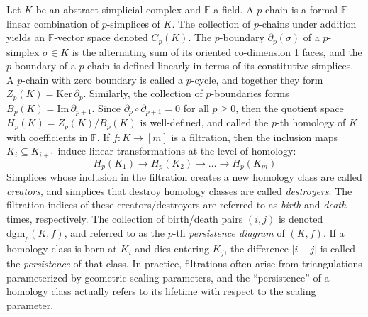 \documentclass[sn-mathphys]{sn-jnl}
\begin{document}
Let $K$ be an abstract simplicial complex and $\mathbb{F}$ a field.
A $p$-chain is a
formal $\mathbb{F}$-linear combination  of $p$-simplices of $K$. The collection of $p$-chains under addition yields an 
$\mathbb{F}$-vector space  denoted   $C_p(K)$. 
The $p$-boundary $\partial_p(\sigma)$  of a $p$-simplex $\sigma\in K$ is the alternating sum of its oriented co-dimension 1 faces,
and the $p$-boundary of a $p$-chain is defined 
linearly in terms of its constitutive simplices. 
A $p$-chain with zero boundary is called a $p$-cycle, and together they form $Z_p(K) = \mathrm{Ker}\,\partial_p$. 
Similarly, the collection of $p$-boundaries forms  $B_p(K) = \mathrm{Im}\,\partial_{p+1}$.
Since $\partial_p \circ \partial_{p+1} = 0$ for all $p\geq 0$, 
then the quotient space $H_p(K) = Z_p(K) / B_{p}(K)$ is well-defined, and called the 
$p$-th homology of $K$ with coefficients in $\mathbb{F}$. 
If $ f: K \rightarrow  [m]$ is a filtration, then the inclusion maps  $K_i\subseteq K_{i+1}$   induce linear transformations 
at the level of homology:
\begin{equation}
	H_p(K_1) \to H_p(K_2) \to \dots \to H_p(K_m)
\end{equation}
Simplices whose inclusion in the filtration creates a new homology class are called \emph{creators}, and simplices that destroy homology classes are   called \emph{destroyers}. 
The filtration indices of 
these creators/destroyers are referred to as \emph{birth} and \emph{death} times, respectively. 
The collection of birth/death  pairs 
$(i,j)$ is denoted $\mathrm{dgm}_p(K ,f )$, 
and referred to as the $p$-th \emph{persistence diagram} of $(K,f)$.
If a homology class is born at   $K_i$ and dies entering   $K_j$, the difference $\lvert i - j \rvert$ is called the \emph{persistence} of that class.
In practice, filtrations often arise from triangulations parameterized by geometric scaling parameters, and the ``persistence'' of a homology class actually refers to its lifetime with respect to the scaling parameter. 
\end{document}
